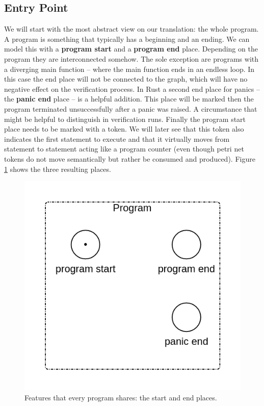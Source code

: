 \subsection{Entry Point}
We will start with the most abstract view on our translation: the whole program.
A program is something that typically has a beginning and an ending.
We can model this with a \textbf{program start} and a \textbf{program end} place.
Depending on the program they are interconnected somehow.
The sole exception are programs with a diverging main function -- where the main function ends in an endless loop.
In this case the end place will not be connected to the graph, which will have no negative effect on the verification process.
In Rust a second end place for panics -- the \textbf{panic end} place -- is a helpful addition.
This place will be marked then the program terminated unsuccessfully after a panic was raised.
A circumstance that might be helpful to distinguish in verification runs.
Finally the program start place needs to be marked with a token.
We will later see that this token also indicates the first statement to execute and that it virtually moves from statement to statement acting like a program counter (even though petri net tokens do not move semantically but rather be consumed and produced).
Figure \ref{program_stub} shows the three resulting places.
\begin{figure}
    \centering
    \includegraphics[width=.4\textwidth]{../diagrams/basic_program_new.png}
    \caption{
        Features that every program shares: the start and end places.
    }
    \label{program_stub}
\end{figure}

